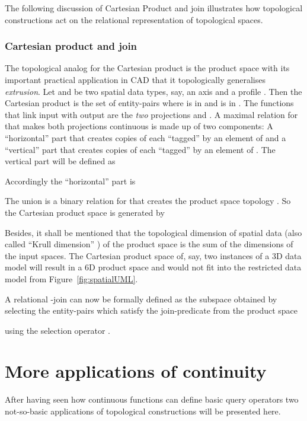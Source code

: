 \documentclass[5p]{elsarticle}
\newcommand{\qq}[1]{``#1''}
\begin{document}
The following discussion of Cartesian Product and join illustrates 
how topological constructions act on the relational representation of 
topological spaces.


\subsubsection{Cartesian product and join} 
The topological analog for the Cartesian product is the product space with 
its important practical application in CAD that it topologically generalises 
\emph{extrusion}. 
Let  and  be two spatial data types, say, an axis  and a profile . 
Then the Cartesian product is the set  of entity-pairs  where  is in  
and  is in . 
The functions that link input with output are the \emph{two} projections 
 and . 
A maximal relation for  that makes both projections continuous is made up of two 
components: 
A \qq{horizontal} part  that creates  copies of  each \qq{tagged} by an element 
of  and a \qq{vertical} part  that creates  copies of  each \qq{tagged} by 
an element of . 
The vertical part will be defined as 

Accordingly the \qq{horizontal} part is 

The union  is a binary relation for  that 
creates the product space topology \cite{BradleyPaul}. 
So the Cartesian product space is generated by 

Besides, it shall be mentioned that the topological dimension of spatial data 
(also called \qq{Krull dimension} \cite[p.\ 5]{Hartshorne:AlgebraicGeometry}) 
of the product space is the sum of the dimensions of the input spaces. 
The Cartesian product space of, say, two instances of a 3D data model 
will result in a 6D product space and would not fit into the restricted data model 
from Figure~\ref{fig:spatialUML}. 

A relational -join can now be formally defined as the subspace obtained by selecting 
the entity-pairs which satisfy the join-predicate  from the product space 

using the selection operator .


\section{More applications of continuity}\label{sec:applications2}

After having seen how continuous functions can define basic query operators 
two not-so-basic applications of topological constructions will be presented here.
\end{document}
